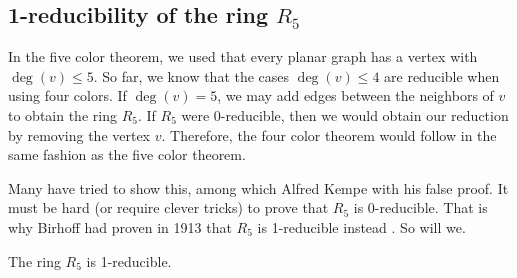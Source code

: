 \subsection{1-reducibility of the ring $R_5$}

In the five color theorem, we used that every planar graph has a vertex with $\deg(v)\leq 5$. So far, we know that the cases $\deg(v) \leq 4$ are reducible when using four colors. If $\deg(v)=5$, we may add edges between the neighbors of $v$ to obtain the ring $R_5$. If $R_5$ were 0-reducible, then we would obtain our reduction by removing the vertex $v$. Therefore, the four color theorem would follow in the same fashion as the five color theorem.

Many have tried to show this, among which Alfred Kempe with his false proof. It must be hard (or require clever tricks) to prove that $R_5$ is 0-reducible. That is why Birhoff had proven in 1913 that $R_5$ is 1-reducible instead \cite{birkhoff}. So will we.

\begin{theorem}
    The ring $R_5$ is 1-reducible.
\end{theorem}


